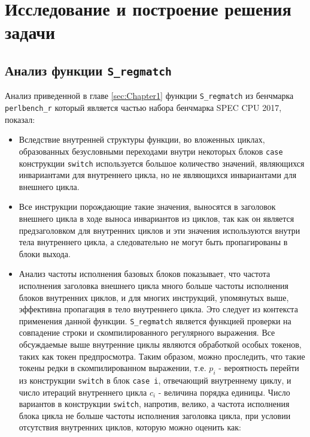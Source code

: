 \chapter{Исследование и построение решения задачи}
\label{sec:Chapter3} 

\section{Анализ функции \texttt{S\_regmatch}}

Анализ приведенной в главе \ref{sec:Chapter1} функции \texttt{S\_regmatch} из бенчмарка\\\texttt{perlbench\_r} который является частью набора бенчмарка SPEC CPU\textsuperscript{\tiny\textregistered} 2017, показал:
\begin{itemize}
    \item Вследствие внутренней структуры функции, во вложенных циклах, образованных безусловными переходами внутри некоторых блоков \texttt{case} конструкции \texttt{switch} используется большое количество значений, являющихся инвариантами для внутреннего цикла, но не являющихся инвариантами для внешнего цикла.
    \item Все инструкции порождающие такие значения, выносятся в заголовок внешнего цикла в ходе выноса инвариантов из циклов, так как он является предзаголовком для внутренних циклов и эти значения используются внутри тела внутреннего цикла, а следовательно не могут быть пропагированы в блоки выхода.
    \item Анализ частоты исполнения базовых блоков показывает, что частота исполнения заголовка внешнего цикла много больше частоты исполнения блоков внутренних циклов, и для многих инструкций, упомянутых выше, эффективна пропагация в тело внутреннего цикла.
        Это следует из контекста применения данной функции.
        \texttt{S\_regmatch} является функцией проверки на совпадение строки и скомпилированного регулярного выражения.
        Все обсуждаемые выше внутренние циклы являются обработкой особых токенов, таких как токен предпросмотра.
        Таким образом, можно проследить, что такие токены редки в скомпилированном выражении, т.е. $p_i$ - вероятность перейти из конструкции \texttt{switch} в блок \texttt{case i}, отвечающий внутреннему циклу, и число итераций внутреннего цикла $c_i$ - величина порядка единицы.
        Число вариантов в конструкции \texttt{switch}, напротив, велико, а частота исполнения блока цикла не больше частоты исполнения заголовка цикла, при условии отсутствия внутренних циклов, которую можно оценить как:

\end{itemize}
